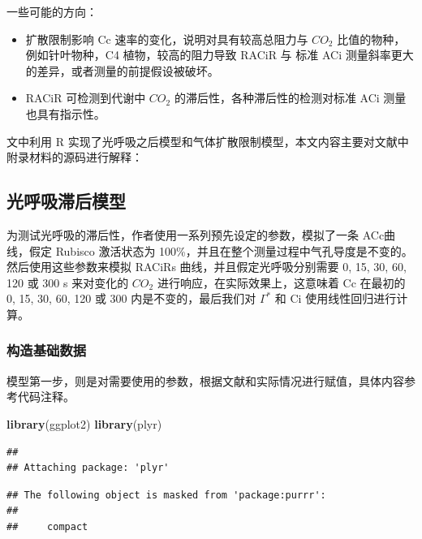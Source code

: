 \documentclass[
]{krantz}
\makeatletter
\newenvironment{Shaded}{\begin{snugshade}}{\end{snugshade}}
\newcommand{\KeywordTok}[1]{\textcolor[rgb]{0.13,0.29,0.53}{\textbf{#1}}}
\newcommand{\NormalTok}[1]{#1}
\newenvironment{kframe}{%
\medskip{}
\setlength{\fboxsep}{.8em}
 \def\at@end@of@kframe{}%
 \ifinner\ifhmode%
  \def\at@end@of@kframe{\end{minipage}}%
  \begin{minipage}{\columnwidth}%
 \fi\fi%
 \def\FrameCommand##1{\hskip\@totalleftmargin \hskip-\fboxsep
 \colorbox{shadecolor}{##1}\hskip-\fboxsep
     \hskip-\linewidth \hskip-\@totalleftmargin \hskip\columnwidth}%
 \MakeFramed {\advance\hsize-\width
   \@totalleftmargin\z@ \linewidth\hsize
   \@setminipage}}%
 {\par\unskip\endMakeFramed%
 \at@end@of@kframe}
\renewenvironment{Shaded}{\begin{kframe}}{\end{kframe}}
\makeatother
\begin{document}
一些可能的方向：

\begin{itemize}
\item
  扩散限制影响 Cc 速率的变化，说明对具有较高总阻力与 \(CO_2\) 比值的物种，例如针叶物种，C4 植物，较高的阻力导致 RACiR 与 标准 ACi 测量斜率更大的差异，或者测量的前提假设被破坏。
\item
  RACiR 可检测到代谢中 \(CO_2\) 的滞后性，各种滞后性的检测对标准 ACi 测量也具有指示性。
\end{itemize}

文中利用 R 实现了光呼吸之后模型和气体扩散限制模型，本文内容主要对文献中附录材料的源码进行解释：

\hypertarget{multi2}{%
\subsection{光呼吸滞后模型}\label{multi2}}

为测试光呼吸的滞后性，作者使用一系列预先设定的参数，模拟了一条 ACc曲线，假定 Rubisco 激活状态为 100\%，并且在整个测量过程中气孔导度是不变的。然后使用这些参数来模拟 RACiRs 曲线，并且假定光呼吸分别需要 0, 15, 30, 60, 120 或 300 s 来对变化的 \(CO_2\) 进行响应，在实际效果上，这意味着 Cc 在最初的 0, 15, 30, 60, 120 或 300 内是不变的，最后我们对 \(\Gamma^*\) 和 Ci 使用线性回归进行计算。

\hypertarget{multi3}{%
\subsubsection{构造基础数据}\label{multi3}}

模型第一步，则是对需要使用的参数，根据文献和实际情况进行赋值，具体内容参考代码注释。

\begin{Shaded}
\begin{Highlighting}[]
\KeywordTok{library}\NormalTok{(ggplot2)}
\KeywordTok{library}\NormalTok{(plyr)}
\end{Highlighting}
\end{Shaded}

\begin{verbatim}
## 
## Attaching package: 'plyr'
\end{verbatim}

\begin{verbatim}
## The following object is masked from 'package:purrr':
## 
##     compact
\end{verbatim}
\end{document}
